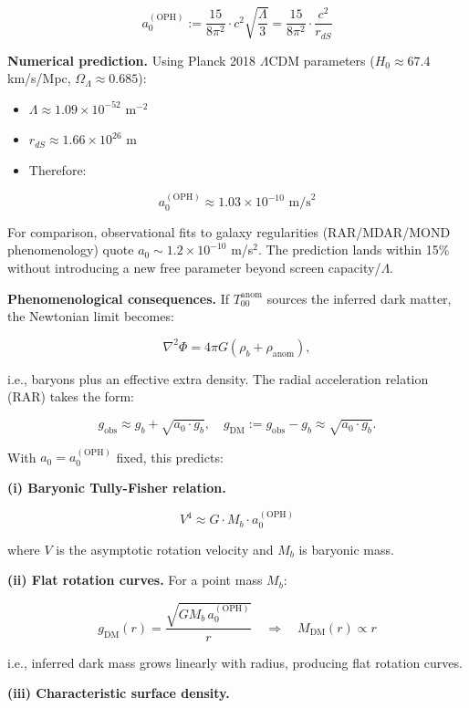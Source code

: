\[
\boxed{
a_0^{\mathrm{(OPH)}} := \frac{15}{8\pi^2} \cdot c^2 \sqrt{\frac{\Lambda}{3}}
= \frac{15}{8\pi^2} \cdot \frac{c^2}{r_{dS}}
}
\]

\textbf{Numerical prediction.} Using Planck 2018 \(\Lambda\)CDM parameters (\(H_0 \approx 67.4\) km/s/Mpc, \(\Omega_\Lambda \approx 0.685\)):

\begin{itemize}
\tightlist
\item
  \(\Lambda \approx 1.09 \times 10^{-52}\) m\(^{-2}\)
\item
  \(r_{dS} \approx 1.66 \times 10^{26}\) m
\item
  Therefore:
\end{itemize}

\[
\boxed{
a_0^{\mathrm{(OPH)}} \approx 1.03 \times 10^{-10} \text{ m/s}^2
}
\]

For comparison, observational fits to galaxy regularities (RAR/MDAR/MOND phenomenology) quote \(a_0 \sim 1.2 \times 10^{-10}\) m/s\(^2\). The prediction lands within 15\% without introducing a new free parameter beyond screen capacity/\(\Lambda\).

\textbf{Phenomenological consequences.} If \(T_{00}^{\mathrm{anom}}\) sources the inferred dark matter, the Newtonian limit becomes:

\[
\nabla^2 \Phi = 4\pi G (\rho_b + \rho_{\mathrm{anom}}),
\]

i.e., baryons plus an effective extra density. The radial acceleration relation (RAR) takes the form:

\[
g_{\mathrm{obs}} \approx g_b + \sqrt{a_0 \cdot g_b},
\quad
g_{\mathrm{DM}} := g_{\mathrm{obs}} - g_b \approx \sqrt{a_0 \cdot g_b}.
\]

With \(a_0 = a_0^{\mathrm{(OPH)}}\) fixed, this predicts:

\textbf{(i) Baryonic Tully-Fisher relation.}

\[
V^4 \approx G \cdot M_b \cdot a_0^{\mathrm{(OPH)}}
\]

where \(V\) is the asymptotic rotation velocity and \(M_b\) is baryonic mass.

\textbf{(ii) Flat rotation curves.} For a point mass \(M_b\):

\[
g_{\mathrm{DM}}(r) = \frac{\sqrt{G M_b \, a_0^{\mathrm{(OPH)}}}}{r}
\quad \Rightarrow \quad
M_{\mathrm{DM}}(r) \propto r
\]

i.e., inferred dark mass grows linearly with radius, producing flat rotation curves.

\textbf{(iii) Characteristic surface density.}

